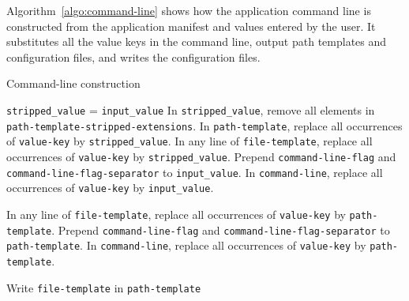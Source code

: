 \documentclass{article}
\begin{document}
Algorithm~\ref{algo:command-line} shows how the application command
line is constructed from the application manifest and values entered
by the user. It substitutes all the value keys in the command line,
output path templates and configuration files, and writes the
configuration files.
\begin{algorithm}[h!]
\caption{Command-line construction}
\label{algo:command-line}
\begin{algorithmic}
  \State {}
  \State \texttt{stripped\_value} = \texttt{input\_value}
  \State In \texttt{stripped\_value}, remove  all elements in \texttt{path-template-stripped-extensions}.
  \EndIf
  \State In \texttt{path-template}, replace all occurrences of \texttt{value-key} by \texttt{stripped\_value}.
  \State In any line of \texttt{file-template}, replace all occurrences of \texttt{value-key} by \texttt{stripped\_value}.
  \EndIf
  \EndFor
  \State Prepend \texttt{command-line-flag} and \texttt{command-line-flag-separator} to \texttt{input\_value}.
  \State In \texttt{command-line}, replace all occurrences of \texttt{value-key} by \texttt{input\_value}.
  \EndIf
  \EndFor

  \State {}
  \State In any line of \texttt{file-template}, replace all occurrences of \texttt{value-key} by \texttt{path-template}.
  \State {}
  \EndIf
  \EndFor
  \State Prepend \texttt{command-line-flag} and \texttt{command-line-flag-separator} to \texttt{path-template}.
  \State In \texttt{command-line}, replace all occurrences of \texttt{value-key} by \texttt{path-template}.
  \EndIf
  \EndFor

  \State {}
  \State Write \texttt{file-template} in \texttt{path-template}
  \State {}
  \EndIf
  \EndFor

\end{algorithmic}
\end{algorithm}
\end{document}
